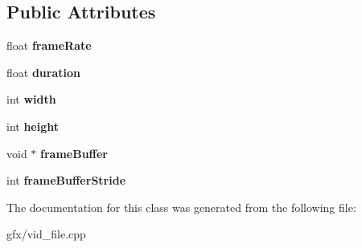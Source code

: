 \subsection*{Public Attributes}
\begin{DoxyCompactItemize}
\item 
float {\bfseries frame\+Rate}\hypertarget{classVidFileImpl_a5dd328642b60cbe8e475040f60b81b00}{}\label{classVidFileImpl_a5dd328642b60cbe8e475040f60b81b00}

\item 
float {\bfseries duration}\hypertarget{classVidFileImpl_a68927960a4116356ff761643e1b95e88}{}\label{classVidFileImpl_a68927960a4116356ff761643e1b95e88}

\item 
int {\bfseries width}\hypertarget{classVidFileImpl_a4215ba1e4703c4d8195df809d847a991}{}\label{classVidFileImpl_a4215ba1e4703c4d8195df809d847a991}

\item 
int {\bfseries height}\hypertarget{classVidFileImpl_a748e69f724e093d168487518584ecabc}{}\label{classVidFileImpl_a748e69f724e093d168487518584ecabc}

\item 
void $\ast$ {\bfseries frame\+Buffer}\hypertarget{classVidFileImpl_a797e664ecccab1ba31bf777e071f9c78}{}\label{classVidFileImpl_a797e664ecccab1ba31bf777e071f9c78}

\item 
int {\bfseries frame\+Buffer\+Stride}\hypertarget{classVidFileImpl_acd1e466cb68836a8ed7d95471c31c806}{}\label{classVidFileImpl_acd1e466cb68836a8ed7d95471c31c806}

\end{DoxyCompactItemize}


The documentation for this class was generated from the following file\+:\begin{DoxyCompactItemize}
\item 
gfx/vid\+\_\+file.\+cpp\end{DoxyCompactItemize}
